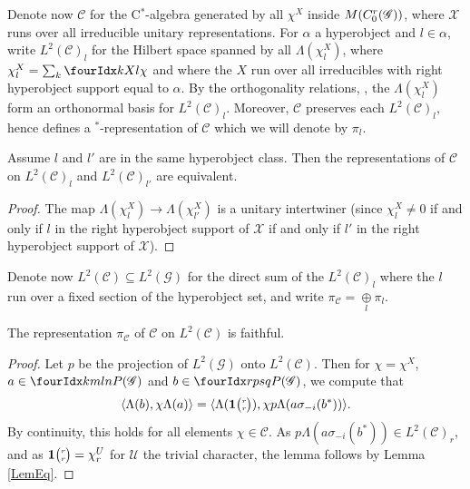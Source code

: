 Denote now $\mathcal{C}$ for the C$^*$-algebra generated by all $\chi^X$ inside $M(C^{r}_{0}(\mathscr{G}))$, where $\mathscr{X}$ runs over all irreducible unitary representations. For $\alpha$ a hyperobject and $l\in \alpha$, write  $L^2(\mathcal{C})_l$ for the Hilbert space spanned by all $\Lambda(\chi^X_l)$, where $\chi^X_l = \sum_{k} \Gr{\chi}{}{X}{k}{l}$ and where the $X$ run over all irreducibles with right hyperobject support equal to $\alpha$. By the orthogonality relations, \cite[Corollary 2.23]{DCT1}, the $\Lambda(\chi^X_l)$ form an orthonormal basis for $L^2(\mathcal{C})_l$. Moreover, $\mathcal{C}$ preserves each $L^2(\mathcal{C})_l$, hence defines a $^*$-representation of $\mathcal{C}$ which we will denote by $\pi_l$. 

\begin{Lem}\label{LemEq} Assume $l$ and $l'$ are in the same hyperobject class. Then the representations of $\mathcal{C}$ on $L^2(\mathcal{C})_l$ and $L^2(\mathcal{C})_{l'}$ are equivalent.
\end{Lem} 
\begin{proof} The map $\Lambda(\chi^X_l)\rightarrow \Lambda(\chi^X_{l'})$ is a unitary intertwiner (since $\chi^X_l\neq 0$ if and only if $l$ in the right hyperobject support of $\mathscr{X}$ if and only if $l'$ in the right hyperobject support of $\mathscr{X}$).
\end{proof} 

Denote now $L^2(\mathcal{C})\subseteq L^2(\mathscr{G})$ for the direct sum of the $L^2(\mathcal{C})_l$ where the $l$ run over a fixed section of the hyperobject set, and write $\pi_{\mathcal{C}}= \underset{l}{\oplus} \pi_l$. 
 
\begin{Prop} The representation $\pi_{\mathcal{C}}$ of $\mathcal{C}$ on $L^2(\mathcal{C})$ is faithful.
\end{Prop} 

\begin{proof} Let $p$ be the projection of $L^2(\mathscr{G})$ onto $L^2(\mathcal{C})$. Then for $\chi = \chi^X$, $a\in \Gr{P(\mathscr{G})}{k}{l}{m}{n}$ and $b\in \Gr{P(\mathscr{G})}{r}{s}{p}{q}$, we compute that \[\langle \Lambda(b),\chi \Lambda(a)\rangle =  \langle \Lambda( \mathbf{1}{\tiny {\begin{pmatrix} r\\r\end{pmatrix}}}),\chi p\Lambda(a\sigma_{-i}(b^*))\rangle.\] By continuity, this holds for all elements $\chi \in \mathcal{C}$. As $p\Lambda(a\sigma_{-i}(b^*)) \in L^2(\mathcal{C})_r$, and as $\mathbf{1}{\tiny {\begin{pmatrix} r\\r\end{pmatrix}}} = \chi^U_r$ for $\mathscr{U}$ the trivial character, the lemma follows by Lemma \ref{LemEq}.
\end{proof}

